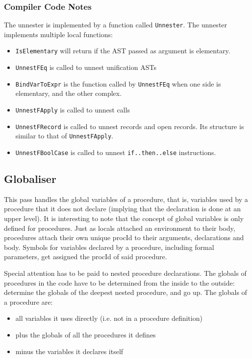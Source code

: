 \documentclass[a4paper]{memoir}
\begin{document}
\subsubsection{Compiler Code Notes}
The unnester is implemented by a function called \lstinline!Unnester!. The unnester implements multiple local functions:
\begin{itemize}
  \item  \lstinline!IsElementary! will return if the AST passed as argument is elementary.
  \item  \lstinline!UnnestFEq! is called to unnest unification ASTs
  \item  \lstinline!BindVarToExpr! is the function called by \lstinline!UnnestFEq! when one side is elementary, and the other complex.
  \item  \lstinline!UnnestFApply! is called to unnest calls
  \item  \lstinline!UnnestFRecord! is called to unnest records and open records. Its structure is similar to that of \lstinline!UnnestFApply!.
  \item  \lstinline!UnnestFBoolCase! is called to unnest \lstinline!if..then..else! instructions.
\end{itemize}
\subsection{Globaliser}\label{sec:arch:globaliser}            
This pass handles the global variables of a procedure, that is, variables used by a procedure that it does not declare (implying that the declaration is done at an upper level). It is interesting to note that the concept of global variables is only defined for procedures.
Just as locals attached an environment to their body, procedures attach their own unique procId to their arguments, declarations and body.
Symbols for variables declared by a procedure, including formal parameters, get assigned the procId of said procedure.

Special attention has to be paid to nested procedure declarations.
The globals of procedures in the code have to be determined from the inside to the outside: determine the globals of the deepest nested procedure, and go up. 
The globals of a procedure are:
\begin{itemize}
  \item all variables it uses directly (i.e. not in a procedure definition)
  \item plus the globals of all the procedures it defines
  \item minus the variables it declares itself
\end{itemize}
\end{document}
